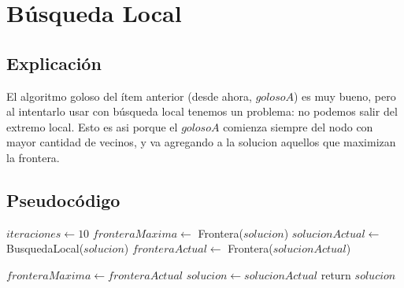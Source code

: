\section{Búsqueda Local}

\subsection{Explicación}


El algoritmo goloso del ítem anterior (desde ahora, $goloso A$) es muy bueno, pero al intentarlo usar con búsqueda local tenemos un problema: no podemos salir del extremo local. Esto es asi porque el $goloso A$ comienza siempre del nodo con mayor cantidad de vecinos, y va agregando a la solucion aquellos que maximizan la frontera.

\subsection{Pseudocódigo}

\begin{algorithm}[H]
\begin{algorithmic}
    \State $iteraciones \gets 10$
    \State $fronteraMaxima \gets$ Frontera($solucion$)
        \State $solucionActual \gets$ BusquedaLocal($solucion$)
        \State $fronteraActual \gets$ Frontera($solucionActual$)

            \State $fronteraMaxima \gets fronteraActual$
            \State $solucion \gets solucionActual$
        \EndIf
    \EndFor
    \State return $solucion$

\EndFunction
\end{algorithmic}
\end{algorithm}



